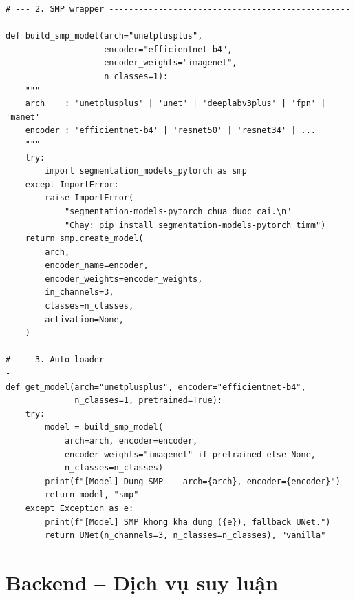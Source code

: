\begin{lstlisting}[style=codePython, caption={Vanilla UNet va SMP wrapper -- ho tro U-Net va U-Net++ (app/models/unet.py)}]
# --- 2. SMP wrapper --------------------------------------------------
def build_smp_model(arch="unetplusplus",
                    encoder="efficientnet-b4",
                    encoder_weights="imagenet",
                    n_classes=1):
    """
    arch    : 'unetplusplus' | 'unet' | 'deeplabv3plus' | 'fpn' | 'manet'
    encoder : 'efficientnet-b4' | 'resnet50' | 'resnet34' | ...
    """
    try:
        import segmentation_models_pytorch as smp
    except ImportError:
        raise ImportError(
            "segmentation-models-pytorch chua duoc cai.\n"
            "Chay: pip install segmentation-models-pytorch timm")
    return smp.create_model(
        arch,
        encoder_name=encoder,
        encoder_weights=encoder_weights,
        in_channels=3,
        classes=n_classes,
        activation=None,
    )

# --- 3. Auto-loader --------------------------------------------------
def get_model(arch="unetplusplus", encoder="efficientnet-b4",
              n_classes=1, pretrained=True):
    try:
        model = build_smp_model(
            arch=arch, encoder=encoder,
            encoder_weights="imagenet" if pretrained else None,
            n_classes=n_classes)
        print(f"[Model] Dung SMP -- arch={arch}, encoder={encoder}")
        return model, "smp"
    except Exception as e:
        print(f"[Model] SMP khong kha dung ({e}), fallback UNet.")
        return UNet(n_channels=3, n_classes=n_classes), "vanilla"
\end{lstlisting}

\section{Backend -- Dịch vụ suy luận}

